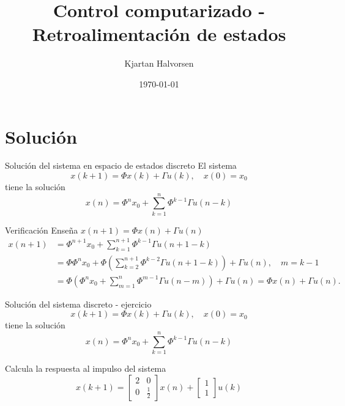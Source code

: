 \documentclass[presentation,aspectratio=1610]{beamer}
\author{Kjartan Halvorsen}
\date{\today}
\title{Control computarizado - Retroalimentación de estados}
\begin{document}
\maketitle

\section{Solución}
\label{sec:org119e12e}
\begin{frame}[label={sec:orgdc8d563}]{Solución del sistema en espacio de estados discreto}
El sistema
\begin{equation*}
x(k+1)=\Phi x(k) + \Gamma u(k), \quad x(0)= x_0
\end{equation*}
tiene la solución
\[x(n) = \Phi^n x_0 + \sum_{k=1}^n \Phi^{k-1} \Gamma u(n-k)\]

\alert{Verificación} Enseña \(x(n+1) = \Phi x(n) + \Gamma u(n)\)
\begin{align*}
x(n+1) &= \Phi^{n+1}x_0 + \sum_{k=1}^{n+1} \Phi^{k-1} \Gamma u(n+1-k)\\
       &= \Phi \Phi^{n}x_0 + \Phi \left( \sum_{k=2}^{n+1} \Phi^{k-2} \Gamma u(n+1-k) \right) + \Gamma u(n), \quad m = k-1\\
       &= \Phi \left( \Phi^{n}x_0 +  \sum_{m=1}^{n} \Phi^{m-1} \Gamma u(n-m) \right) + \Gamma u(n) 
       = \Phi x(n) + \Gamma u(n).
\end{align*}
\end{frame}


\begin{frame}[label={sec:orge172512}]{Solución del sistema discreto - ejercicio}
\begin{equation*}
x(k+1)=\Phi x(k) + \Gamma u(k), \quad x(0)= x_0
\end{equation*}
tiene la solución
\[x(n) = \Phi^n x_0 + \sum_{k=1}^n \Phi^{k-1} \Gamma u(n-k)\]

Calcula la respuesta al impulso del sistema 
\[ x(k+1) = \begin{bmatrix} 2 & 0\\0 & \frac{1}{2} \end{bmatrix} x(n) + \begin{bmatrix} 1\\1\end{bmatrix} u(k) \]

\begin{center}
\end{center}
\end{frame}
\end{document}
